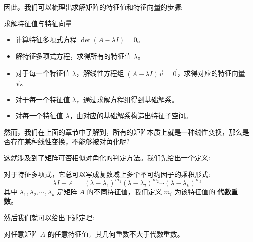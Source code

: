 \documentclass[a4paper,12pt]{ctexart}
\begin{document}
因此，我们可以梳理出求解矩阵的特征值和特征向量的步骤:

\newpage

\begin{myalgo}{求解特征值与特征向量}{}
\begin{itemize}
    \item 计算特征多项式方程 $\det(A - \lambda I) = 0$。
    \item 解特征多项式方程，求得所有的特征值 $\lambda$。
    \item 对于每一个特征值 $\lambda$，解线性方程组 $(A - \lambda I) \vec{v} = \vec{0}$，求得对应的特征向量 $\vec{v}$。
    \item 对于每一个特征值 $\lambda$，通过求解方程组得到基础解系。
    \item 对每一个特征值 $\lambda$，由对应的基础解系构造出特征子空间。
\end{itemize}
\end{myalgo}

然而，我们在上面的章节中了解到，所有的矩阵本质上就是一种线性变换，那么是否存在某种线性变换，不能够被对角化呢?

这就涉及到了矩阵可否相似对角化的判定方法。我们先给出一个定义:

对于特征多项式，它总可以写成复数域上多个不可约因子的乘积形式:
\[
|\lambda I - A| = (\lambda - \lambda_1)^{m_1} (\lambda - \lambda_2)^{m_2} \cdots (\lambda - \lambda_k)^{m_k}
\]
其中 $\lambda_1, \lambda_2, \cdots, \lambda_k$ 是矩阵 $A$ 的不同特征值，我们定义 $m_i$ 为该特征值的 \textbf{代数重数}。

然后我们就可以给出下述定理:

\begin{mythm}{}{}
    对任意矩阵 $A$ 的任意特征值，其几何重数不大于代数重数。
\end{mythm}
\end{document}
